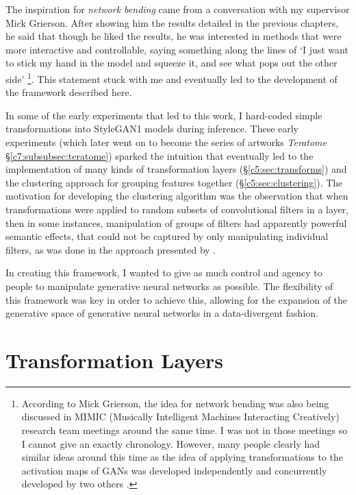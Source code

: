 The inspiration for \textit{network bending} came from a conversation with my supervisor Mick Grierson.
After showing him the results detailed in the previous chapters, he said that though he liked the results, he was interested in methods that were more interactive and controllable, saying something along the lines of `I just want to stick my hand in the model and squeeze it, and see what pops out the other side' \citep{grierson2019personal}\footnote{According to Mick Grierson, the idea for network bending was also being discussed in MIMIC (Musically Intelligent Machines Interacting Creatively) research team meetings around the same time. I was not in those meetings so I cannot give an exactly chronology. However, many people clearly had similar ideas around this time as the idea of applying transformations to the activation maps of GANs was developed independently and concurrently developed by two others \citep{pinkney2020matlab,pouliot2020gan}.}. 
This statement stuck with me and eventually led to the development of the framework described here.

In some of the early experiments that led to this work, I hard-coded simple transformations into StyleGAN1 \citep{karras2019style} models during inference.
These early experiments (which later went on to become the series of artworks \textit{Teratome} \S \ref{c7:subsubsec:teratome}) sparked the intuition that eventually led to the implementation of many kinds of transformation layers (\S \ref{c5:sec:transforms}) and the clustering approach for grouping features together (\S \ref{c5:sec:clustering}).
The motivation for developing the clustering algorithm was the observation that when transformations were applied to random subsets of convolutional filters in a layer, then in some instances, manipulation of groups of filters had apparently powerful semantic effects, that could not be captured by only manipulating individual filters, as was done in the approach presented by \citep{bau2019semantic}.

In creating this framework, I wanted to give as much control and agency to people to manipulate generative neural networks as possible. 
The flexibility of this framework was key in order to achieve this, allowing for the expansion of the generative space of generative neural networks in a data-divergent fashion.

\section{Transformation Layers}

